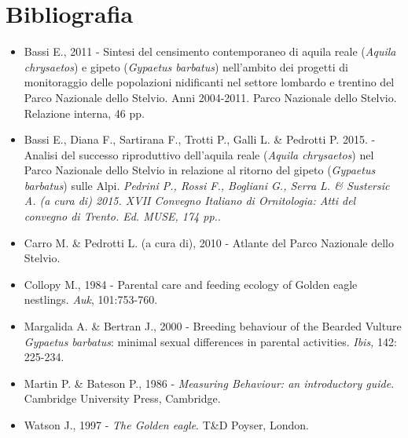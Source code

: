 \section*{Bibliografia}
\begin{itemize}\itemsep0pt
	\item Bassi E., 2011 - Sintesi del censimento contemporaneo di aquila reale
(\textit{Aquila chrysaetos}) e gipeto (\textit{Gypaetus barbatus})
nell{\textquoteright}ambito dei progetti di monitoraggio delle
popolazioni nidificanti nel settore lombardo e trentino del Parco
Nazionale dello Stelvio. Anni 2004-2011. Parco Nazionale dello Stelvio.
Relazione interna, 46 pp.

	\item Bassi E., Diana F., Sartirana F., Trotti P., Galli L. \& Pedrotti P. 2015. - Analisi del successo riproduttivo
dell{\textquoteright}aquila reale (\textit{Aquila chrysaetos}) nel
Parco Nazionale dello Stelvio in relazione al ritorno del gipeto
(\textit{Gypaetus barbatus}) sulle Alpi. \textit{Pedrini P., Rossi F., Bogliani G., Serra L. \& Sustersic A. (a cura di) 2015. \emph{XVII Convegno Italiano di Ornitologia: Atti del convegno di Trento}. Ed. MUSE, 174 pp.}.

	\item Carro M. \& Pedrotti L. (a cura di), 2010 - Atlante del Parco Nazionale
dello Stelvio.

	\item Collopy M., 1984 - Parental care and feeding ecology of Golden eagle
nestlings. \textit{Auk}, 101:753-760.

	\item Margalida A. \& Bertran J., 2000 - Breeding behaviour of the Bearded
Vulture \textit{Gypaetus barbatus}: minimal sexual differences in
parental activities. \textit{Ibis,} 142: 225-234.

	\item Martin P. \& Bateson P., 1986 - \textit{Measuring Behaviour: an
introductory guide}. Cambridge University Press, Cambridge.

	\item Watson J., 1997 - \textit{The Golden eagle}. T\&D Poyser, London.
\end{itemize}
